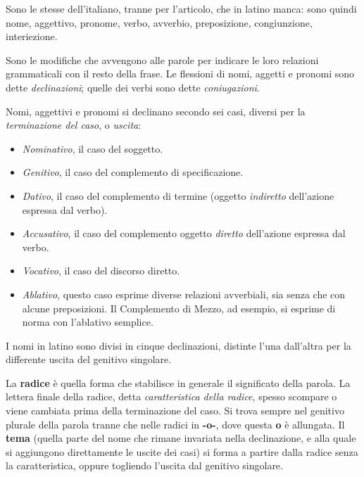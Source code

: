 \documentclass[nols]{tufte-handout}
\newcommand{\textls}[2][5]{%
    \begingroup\addfontfeatures{LetterSpace=#1}#2\endgroup
  }
\renewcommand{\smallcapsspacing}[1]{\textls[10]{#1}}
\renewcommand{\textsc}[1]{\smallcapsspacing{\textsmallcaps{#1}}}
\begin{document}
 Sono le stesse dell'italiano, tranne per l'articolo, che in latino manca: sono quindi nome, aggettivo, pronome, verbo, avverbio, preposizione, congiunzione, interiezione.

 Sono le modifiche che avvengono alle parole per indicare le loro relazioni grammaticali con il resto della frase. Le flessioni di nomi, aggetti e pronomi sono dette \textit{declinazioni}; quelle dei verbi sono dette \textit{coniugazioni}.

 Nomi, aggettivi e pronomi si declinano secondo sei casi, diversi per la \textit{terminazione del caso}, o \textit{uscita}:

\begin{itemize}
\item[\textsc{1.}] \textit{Nominativo}, il caso del soggetto.  
\item[\textsc{2.}] \textit{Genitivo}, il caso del complemento di specificazione.  
\item[\textsc{3.}] \textit{Dativo}, il caso del complemento di termine (oggetto \textit{indiretto} dell'azione espressa dal verbo).  
\item[\textsc{4.}] \textit{Accusativo}, il caso del complemento oggetto \textit{diretto} dell'azione espressa dal verbo.
\item[\textsc{5.}] \textit{Vocativo}, il caso del discorso diretto.  
\item[\textsc{6.}] \textit{Ablativo}, questo caso esprime diverse relazioni avverbiali, sia senza che con alcune preposizioni. Il Complemento di Mezzo, ad esempio, si esprime di norma con l'ablativo semplice. 
\end{itemize}
I nomi in latino sono divisi in cinque declinazioni, distinte l'una dall'altra per la differente uscita del genitivo singolare.

 La \textbf{radice} è quella forma che stabilisce in generale il significato della parola. La lettera finale della radice, detta \textit{caratteristica della radice}, spesso scompare o viene cambiata prima della terminazione del caso. Si trova sempre nel genitivo plurale della parola tranne che nelle radici in \textbf{-o-}, dove questa \textbf{o} è allungata. Il \textbf{tema} (quella parte del nome che rimane invariata nella declinazione, e alla quale si aggiungono direttamente le uscite dei casi) si forma a partire dalla radice senza la caratteristica, oppure togliendo l'uscita dal genitivo singolare. 
\end{document}
